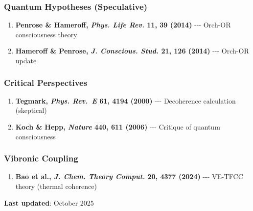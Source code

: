 \subsubsection{Quantum Hypotheses
(Speculative)}\label{quantum-hypotheses-speculative}

\begin{enumerate}
\def\labelenumi{\arabic{enumi}.}
\setcounter{enumi}{3}
\tightlist
\item
  \textbf{Penrose \& Hameroff, \emph{Phys. Life Rev.} 11, 39 (2014)}
  -\/-\/- Orch-OR consciousness theory
\item
  \textbf{Hameroff \& Penrose, \emph{J. Conscious. Stud.} 21, 126
  (2014)} -\/-\/- Orch-OR update
\end{enumerate}

\subsubsection{Critical Perspectives}\label{critical-perspectives}

\begin{enumerate}
\def\labelenumi{\arabic{enumi}.}
\setcounter{enumi}{5}
\tightlist
\item
  \textbf{Tegmark, \emph{Phys. Rev.~E} 61, 4194 (2000)} -\/-\/-
  Decoherence calculation (skeptical)
\item
  \textbf{Koch \& Hepp, \emph{Nature} 440, 611 (2006)} -\/-\/- Critique
  of quantum consciousness
\end{enumerate}

\subsubsection{Vibronic Coupling}\label{vibronic-coupling}

\begin{enumerate}
\def\labelenumi{\arabic{enumi}.}
\setcounter{enumi}{7}
\tightlist
\item
  \textbf{Bao et al., \emph{J. Chem. Theory Comput.} 20, 4377 (2024)}
  -\/-\/- VE-TFCC theory (thermal coherence)
\end{enumerate}

\textbf{Last updated}: October 2025
